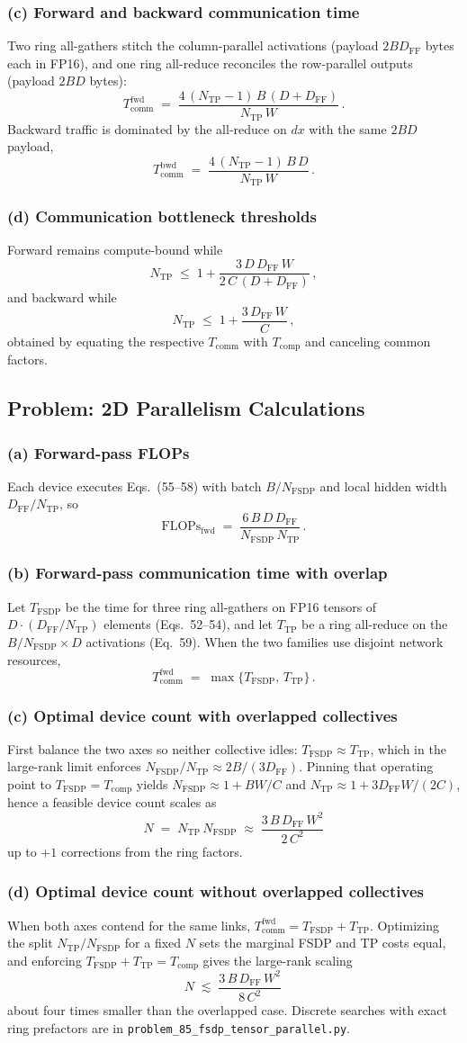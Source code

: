 \documentclass[11pt]{article}
\newcommand{\question}[1]{\subsection*{#1}}
\newcommand{\subquestion}[1]{\subsubsection*{#1}}
\begin{document}
\subquestion{(c) Forward and backward communication time}
Two ring all-gathers stitch the column-parallel activations (payload $2 B D_{\mathrm{FF}}$ bytes each in FP16), and one ring all-reduce reconciles the row-parallel outputs (payload $2 B D$ bytes):
\[
  T_{\mathrm{comm}}^{\mathrm{fwd}} \;=\; \frac{4\,(N_{\mathrm{TP}}-1)\,B\,(D+D_{\mathrm{FF}})}{N_{\mathrm{TP}}\,W}\,.
\]
Backward traffic is dominated by the all-reduce on $d x$ with the same $2 B D$ payload,
\[
  T_{\mathrm{comm}}^{\mathrm{bwd}} \;=\; \frac{4\,(N_{\mathrm{TP}}-1)\,B\,D}{N_{\mathrm{TP}}\,W}\,.
\]
\subquestion{(d) Communication bottleneck thresholds}
Forward remains compute-bound while
\[
  N_{\mathrm{TP}} \;\le\; 1 + \frac{3\,D\,D_{\mathrm{FF}}\,W}{2\,C\,(D+D_{\mathrm{FF}})}\,,
\]
and backward while
\[
  N_{\mathrm{TP}} \;\le\; 1 + \frac{3\,D_{\mathrm{FF}}\,W}{C}\,,
\]
obtained by equating the respective $T_{\mathrm{comm}}$ with $T_{\mathrm{comp}}$ and canceling common factors.

\question{Problem: 2D Parallelism Calculations}
\subquestion{(a) Forward-pass FLOPs}
Each device executes Eqs.~(55--58) with batch $B/N_{\mathrm{FSDP}}$ and local hidden width $D_{\mathrm{FF}}/N_{\mathrm{TP}}$, so
\[
  \mathrm{FLOPs}_{\mathrm{fwd}} \;=\; \frac{6\,B\,D\,D_{\mathrm{FF}}}{N_{\mathrm{FSDP}}\,N_{\mathrm{TP}}}\,.
\]
\subquestion{(b) Forward-pass communication time with overlap}
Let $T_{\mathrm{FSDP}}$ be the time for three ring all-gathers on FP16 tensors of $D\cdot (D_{\mathrm{FF}}/N_{\mathrm{TP}})$ elements (Eqs.~52--54), and let $T_{\mathrm{TP}}$ be a ring all-reduce on the $B/N_{\mathrm{FSDP}}\times D$ activations (Eq.~59). When the two families use disjoint network resources,
\[
  T_{\mathrm{comm}}^{\mathrm{fwd}} \;=\; \max\{T_{\mathrm{FSDP}},\,T_{\mathrm{TP}}\}\,.
\]
\subquestion{(c) Optimal device count with overlapped collectives}
First balance the two axes so neither collective idles: $T_{\mathrm{FSDP}}\approx T_{\mathrm{TP}}$, which in the large-rank limit enforces $N_{\mathrm{FSDP}}/N_{\mathrm{TP}}\approx 2B/(3 D_{\mathrm{FF}})$. Pinning that operating point to $T_{\mathrm{FSDP}}=T_{\mathrm{comp}}$ yields $N_{\mathrm{FSDP}}\approx 1 + B W/C$ and $N_{\mathrm{TP}}\approx 1 + 3 D_{\mathrm{FF}} W/(2 C)$, hence a feasible device count scales as
\[
  N \;=\; N_{\mathrm{TP}}\,N_{\mathrm{FSDP}} \;\approx\; \frac{3\,B\,D_{\mathrm{FF}}\,W^{2}}{2\,C^{2}}
\]
up to $+1$ corrections from the ring factors.

\subquestion{(d) Optimal device count without overlapped collectives}
When both axes contend for the same links, $T_{\mathrm{comm}}^{\mathrm{fwd}} = T_{\mathrm{FSDP}} + T_{\mathrm{TP}}$. Optimizing the split $N_{\mathrm{TP}}/N_{\mathrm{FSDP}}$ for a fixed $N$ sets the marginal FSDP and TP costs equal, and enforcing $T_{\mathrm{FSDP}}+T_{\mathrm{TP}}=T_{\mathrm{comp}}$ gives the large-rank scaling
\[
  N \;\lesssim\; \frac{3\,B\,D_{\mathrm{FF}}\,W^{2}}{8\,C^{2}}\,
\]
about four times smaller than the overlapped case. Discrete searches with exact ring prefactors are in \texttt{problem\_85\_fsdp\_tensor\_parallel.py}.
\end{document}

